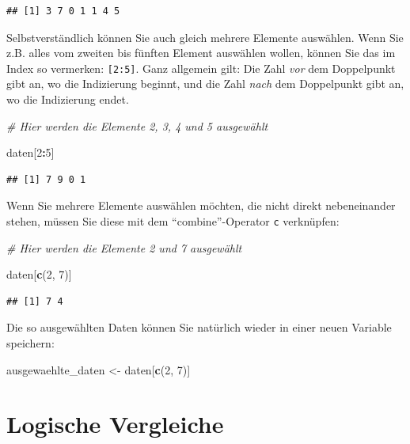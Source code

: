 \documentclass[
  ngerman,
]{book}
\newenvironment{Shaded}{\begin{snugshade}}{\end{snugshade}}
\newcommand{\CommentTok}[1]{\textcolor[rgb]{0.56,0.35,0.01}{\textit{#1}}}
\newcommand{\DecValTok}[1]{\textcolor[rgb]{0.00,0.00,0.81}{#1}}
\newcommand{\FunctionTok}[1]{\textcolor[rgb]{0.13,0.29,0.53}{\textbf{#1}}}
\newcommand{\NormalTok}[1]{#1}
\newcommand{\OtherTok}[1]{\textcolor[rgb]{0.56,0.35,0.01}{#1}}
\newcommand{\SpecialCharTok}[1]{\textcolor[rgb]{0.81,0.36,0.00}{\textbf{#1}}}
\begin{document}
\begin{verbatim}
## [1] 3 7 0 1 1 4 5
\end{verbatim}

Selbstverständlich können Sie auch gleich mehrere Elemente auswählen. Wenn Sie z.B. alles vom zweiten bis fünften Element auswählen wollen, können Sie das im Index so vermerken: \texttt{{[}2:5{]}}. Ganz allgemein gilt: Die Zahl \emph{vor} dem Doppelpunkt gibt an, wo die Indizierung beginnt, und die Zahl \emph{nach} dem Doppelpunkt gibt an, wo die Indizierung endet.

\begin{Shaded}
\begin{Highlighting}[]
\CommentTok{\# Hier werden die Elemente 2, 3, 4 und 5 ausgewählt}

\NormalTok{daten[}\DecValTok{2}\SpecialCharTok{:}\DecValTok{5}\NormalTok{]}
\end{Highlighting}
\end{Shaded}

\begin{verbatim}
## [1] 7 9 0 1
\end{verbatim}

Wenn Sie mehrere Elemente auswählen möchten, die nicht direkt nebeneinander stehen, müssen Sie diese mit dem ``combine''-Operator \texttt{c} verknüpfen:

\begin{Shaded}
\begin{Highlighting}[]
\CommentTok{\# Hier werden die Elemente 2 und 7 ausgewählt}

\NormalTok{daten[}\FunctionTok{c}\NormalTok{(}\DecValTok{2}\NormalTok{, }\DecValTok{7}\NormalTok{)]}
\end{Highlighting}
\end{Shaded}

\begin{verbatim}
## [1] 7 4
\end{verbatim}

Die so ausgewählten Daten können Sie natürlich wieder in einer neuen Variable speichern:

\begin{Shaded}
\begin{Highlighting}[]
\NormalTok{ausgewaehlte\_daten }\OtherTok{\textless{}{-}}\NormalTok{ daten[}\FunctionTok{c}\NormalTok{(}\DecValTok{2}\NormalTok{, }\DecValTok{7}\NormalTok{)]}
\end{Highlighting}
\end{Shaded}

\section{Logische Vergleiche}\label{logische-vergleiche}
\end{document}

